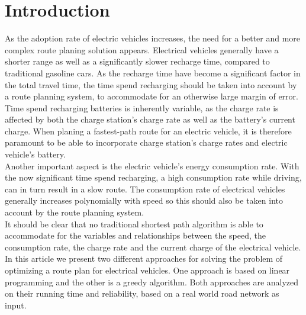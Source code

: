 \section{Introduction}

As the adoption rate of electric vehicles increases, the need for a better and more complex route planing solution appears. Electrical vehicles generally have a shorter range as well as a significantly slower recharge time, compared to traditional gasoline cars. As the recharge time have become a significant factor in the total travel time, the time spend recharging should be taken into account by a route planning system, to accommodate for an otherwise large margin of error. Time spend recharging batteries is inherently variable, as the charge rate is affected by both the charge station's charge rate as well as the battery's current charge. When planing a fastest-path route for an electric vehicle, it is therefore paramount to be able to incorporate charge station's charge rates and electric vehicle's battery.\\

Another important aspect is the electric vehicle's energy consumption rate. With the now significant time spend recharging, a high consumption rate while driving, can in turn result in a slow route. The consumption rate of electrical vehicles generally increases polynomially with speed so this should also be taken into account by the route planning system.\\

It should be clear that no traditional shortest path algorithm is able to accommodate for the variables and relationships between the speed, the consumption rate, the charge rate and the current charge of the electrical vehicle. In this article we present two different approaches for solving the problem of optimizing a route plan for electrical vehicles. One approach is based on linear programming and the other is a greedy algorithm. Both approaches are analyzed on their running time and reliability, based on a real world road network as input.




